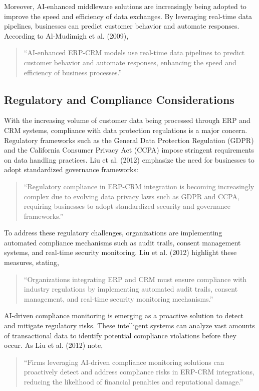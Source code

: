 Moreover, AI-enhanced middleware solutions are increasingly being adopted to improve the speed and efficiency of data exchanges. By leveraging real-time data pipelines, businesses can predict customer behavior and automate responses. According to Al-Mudimigh et al. (2009), 
\begin{quote}
    ``AI-enhanced ERP-CRM models use real-time data pipelines to predict customer behavior and automate responses, enhancing the speed and efficiency of business processes.'' \cite{almudimigh2009}
\end{quote}

\subsection{Regulatory and Compliance Considerations}

With the increasing volume of customer data being processed through ERP and CRM systems, compliance with data protection regulations is a major concern. Regulatory frameworks such as the General Data Protection Regulation (GDPR) and the California Consumer Privacy Act (CCPA) impose stringent requirements on data handling practices. Liu et al. (2012) emphasize the need for businesses to adopt standardized governance frameworks:
\begin{quote}
    ``Regulatory compliance in ERP-CRM integration is becoming increasingly complex due to evolving data privacy laws such as GDPR and CCPA, requiring businesses to adopt standardized security and governance frameworks.'' \cite{liu2012}
\end{quote}

To address these regulatory challenges, organizations are implementing automated compliance mechanisms such as audit trails, consent management systems, and real-time security monitoring. Liu et al. (2012) highlight these measures, stating,
\begin{quote}
    ``Organizations integrating ERP and CRM must ensure compliance with industry regulations by implementing automated audit trails, consent management, and real-time security monitoring mechanisms.'' \cite{liu2012}
\end{quote}

AI-driven compliance monitoring is emerging as a proactive solution to detect and mitigate regulatory risks. These intelligent systems can analyze vast amounts of transactional data to identify potential compliance violations before they occur. As Liu et al. (2012) note,
\begin{quote}
    ``Firms leveraging AI-driven compliance monitoring solutions can proactively detect and address compliance risks in ERP-CRM integrations, reducing the likelihood of financial penalties and reputational damage.'' \cite{liu2012}
\end{quote}


